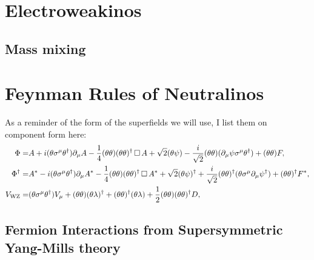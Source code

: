 \documentclass[../main.tex]{subfiles}
\begin{document}
\section{Electroweakinos}
\subsection{Mass mixing}

\section{Feynman Rules of Neutralinos}

\begin{temporary}
    As a reminder of the form of the superfields we will use, I list them on component form here:
    \begin{subequations}
        \begin{align}
            \Phi =         & A + i(\theta\sigma^\mu\theta^\dagger) \partial_\mu A - \frac{1}{4} (\theta\theta)(\theta\theta)^\dagger \operatorname{\Box} A +
            \sqrt{2} (\theta\psi) - \frac{i}{\sqrt{2}} (\theta\theta) (\partial_\mu \psi \sigma^\mu \theta^\dagger) + (\theta\theta) F,                     \\
            \Phi^\dag =    & A^\ast - i(\theta\sigma^\mu\theta^\dagger) \partial_\mu A^\ast - \frac{1}{4} (\theta\theta)(\theta\theta)^\dagger \operatorname{\Box} A^\ast +
            \sqrt{2} (\theta\psi)^\dagger + \frac{i}{\sqrt{2}} (\theta\theta)^\dagger
            (\theta \sigma^\mu \partial_\mu \psi^\dagger) + (\theta\theta)^\dagger F^\ast,                                                                  \\
            {V}_\text{WZ} = & (\theta\sigma^\mu\theta^\dagger) V_\mu + (\theta\theta) (\theta\lambda)^\dagger +
            (\theta\theta)^\dagger(\theta\lambda) + \frac{1}{2}
            (\theta\theta)(\theta\theta)^\dagger D,
        \end{align}
    \end{subequations}
\end{temporary}

\subsection{Fermion Interactions from Supersymmetric Yang-Mills theory}
\end{document}
